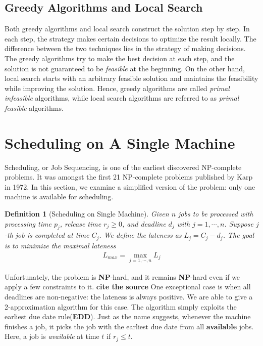 \documentclass[11pt,psfig,times]{article}
\newcommand*{\NP}{\textbf{NP}}
\newtheorem{definition}[theorem]{Definition}
\begin{document}
\subsection{Greedy Algorithms and Local Search}
Both greedy algorithms and local search construct the solution step by step. 
In each step, the strategy makes certain decisions to optimize the result locally. 
The difference between the two techniques lies in the strategy of making decisions. 
The greedy algorithms try to make the best decision at each step, and the solution is not guaranteed to 
be \textit{feasible} at the beginning. On the other hand, local search starts with an arbitrary feasible solution
and maintains the feasibility while improving the solution. 
Hence, greedy algorithms are called \textit{primal infeasible} algorithms, while local search algorithms 
are referred to as \textit{primal feasible} algorithms.


\section{Scheduling on A Single Machine}
Scheduling, or Job Sequencing, is one of the earliest discovered NP-complete problems. 
It was amongst the first 21 NP-complete problems published by Karp in 1972. In this section, 
we examine a simplified version of the problem: only one machine is available for scheduling.
\begin{definition}[Scheduling on Single Machine]
    Given $n$ jobs to be processed with processing time $p_j$, release time $r_j \geq 0$, and deadline $d_j$ with $j = 1, \cdots, n$.
    Suppose $j$-th job is completed at time $C_j$. We define the lateness as $L_j = C_j - d_j$. The goal is to minimize the maximal lateness 
    \begin{align*}
        L_{max} = \max_{j = 1, \cdots, n} L_j
    \end{align*}
\end{definition} 
Unfortunately, the problem is \NP-hard, and it remains \NP-hard even if we apply 
a few constraints to it. \textbf{cite the source} One exceptional case is when all deadlines are non-negative: the lateness is always positive. 
We are able to give a 2-approximation algorithm for this case. The algorithm simply exploits the earliest due date rule(\textbf{EDD}). 
Just as the name suggests, whenever the machine finishes a job, it picks the job with the earliest due date from all \textbf{available} jobs.
Here, a job is \textit{available} at time $t$ if $r_j \leq t$.
\end{document}
